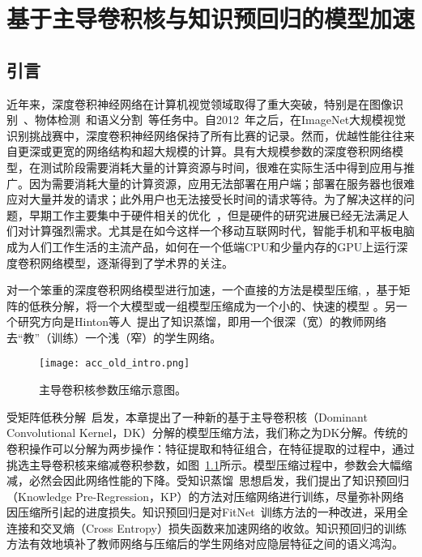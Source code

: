 \chapter{基于主导卷积核与知识预回归的模型加速}
\label{cha:acc}

\section{引言}
\label{sec:acc:introduction}

近年来，深度卷积神经网络在计算机视觉领域取得了重大突破，特别是在图像识别~\cite{krizhevsky2012imagenet}、物体检测~\cite{girshick2014rich}和语义分割~\cite{sermanet2013overfeat}等任务中。自2012~\cite{krizhevsky2012imagenet}年之后，在ImageNet大规模视觉识别挑战赛中，深度卷积神经网络保持了所有比赛的记录。然而，优越性能往往来自更深或更宽的网络结构和超大规模的计算。具有大规模参数的深度卷积网络模型，在测试阶段需要消耗大量的计算资源与时间，很难在实际生活中得到应用与推广。因为需要消耗大量的计算资源，应用无法部署在用户端；部署在服务器也很难应对大量并发的请求；此外用户也无法接受长时间的请求等待。为了解决这样的问题，早期工作主要集中于硬件相关的优化~\cite{vanhoucke2011improving,farabet2011large,krizhevsky2014one,krizhevsky2012imagenet,jia2014caffe}，但是硬件的研究进展已经无法满足人们对计算强烈需求。尤其是在如今这样一个移动互联网时代，智能手机和平板电脑成为人们工作生活的主流产品，如何在一个低端CPU和少量内存的GPU上运行深度卷积网络模型，逐渐得到了学术界的关注。

对一个笨重的深度卷积网络模型进行加速，一个直接的方法是模型压缩\cite{denil2013predicting,jaderberg2014speeding,denton2014exploiting,lebedev2014speeding,zhang2015efficient}, \cite{jaderberg2014speeding}，基于矩阵的低秩分解，将一个大模型或一组模型压缩成为一个小的、快速的模型 。另一个研究方向是Hinton等人~\cite{hinton2015distilling}提出了知识蒸馏，即用一个很深（宽）的教师网络去“教”（训练）一个浅（窄）的学生网络\cite{hinton2015distilling,bucilu2006model,ba2014deep,romero2014fitnets}。

\begin{figure}[t]
\centering
\texttt{[image: acc\_old\_intro.png]}
\caption{主导卷积核参数压缩示意图。}
\label{fig:acc_old_intro}
\end{figure} 

受矩阵低秩分解~\cite{zhang2015efficient}启发，本章提出了一种新的基于主导卷积核（Dominant Convolutional Kernel，DK）分解的模型压缩方法，我们称之为DK分解。传统的卷积操作可以分解为两步操作：特征提取和特征组合，在特征提取的过程中，通过挑选主导卷积核来缩减卷积参数，如图~\ref{fig:acc_old_intro}所示。模型压缩过程中，参数会大幅缩减，必然会因此网络性能的下降。受知识蒸馏~\cite{hinton2015distilling}思想启发，我们提出了知识预回归（Knowledge Pre-Regression，KP）的方法对压缩网络进行训练，尽量弥补网络因压缩所引起的进度损失。知识预回归是对FitNet~\cite{romero2014fitnets}训练方法的一种改进，采用全连接和交叉熵（Cross Entropy）损失函数来加速网络的收敛。知识预回归的训练方法有效地填补了教师网络与压缩后的学生网络对应隐层特征之间的语义鸿沟。


